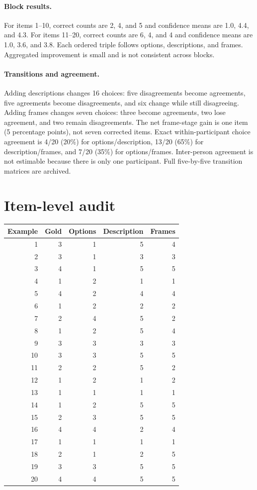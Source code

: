 \paragraph{Block results.} For items 1--10, correct counts are 2, 4, and 5 and confidence means are 1.0, 4.4, and 4.3. For items 11--20, correct counts are 6, 4, and 4 and confidence means are 1.0, 3.6, and 3.8. Each ordered triple follows options, descriptions, and frames. Aggregated improvement is small and is not consistent across blocks.

\paragraph{Transitions and agreement.} Adding descriptions changes 16 choices: five disagreements become agreements, five agreements become disagreements, and six change while still disagreeing. Adding frames changes seven choices: three become agreements, two lose agreement, and two remain disagreements. The net frame-stage gain is one item (5 percentage points), not seven corrected items. Exact within-participant choice agreement is 4/20 (20\%) for options/description, 13/20 (65\%) for description/frames, and 7/20 (35\%) for options/frames. Inter-person agreement is not estimable because there is only one participant. Full five-by-five transition matrices are archived.

\clearpage
\section*{Item-level audit}
\begin{center}
\begin{tabular}{rrrrr}\toprule
Example & Gold & Options & Description & Frames\\\midrule
1 & 3 & 1 & 5 & 4\\
2 & 3 & 1 & 3 & 3\\
3 & 4 & 1 & 5 & 5\\
4 & 1 & 2 & 1 & 1\\
5 & 4 & 2 & 4 & 4\\
6 & 1 & 2 & 2 & 2\\
7 & 2 & 4 & 5 & 2\\
8 & 1 & 2 & 5 & 4\\
9 & 3 & 3 & 3 & 3\\
10 & 3 & 3 & 5 & 5\\
11 & 2 & 2 & 5 & 2\\
12 & 1 & 2 & 1 & 2\\
13 & 1 & 1 & 1 & 1\\
14 & 1 & 2 & 5 & 5\\
15 & 2 & 3 & 5 & 5\\
16 & 4 & 4 & 2 & 4\\
17 & 1 & 1 & 1 & 1\\
18 & 2 & 1 & 2 & 5\\
19 & 3 & 3 & 5 & 5\\
20 & 4 & 4 & 5 & 5\\
\bottomrule\end{tabular}
\end{center}

